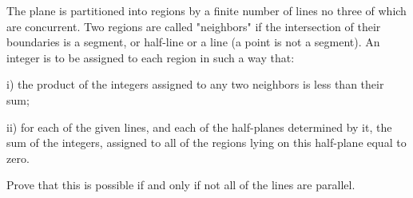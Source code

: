 The plane is partitioned into regions by a finite number of lines no three of which are concurrent. Two regions are called "neighbors" if the intersection of their boundaries is a segment, or half-line or a line (a point is not a segment). An integer is to be assigned to each region in such a way that:

i) the product of the integers assigned to any two neighbors is less than their sum;

ii) for each of the given lines, and each of the half-planes determined by it, the sum of the integers, assigned to all of the regions lying on this half-plane equal to zero.

Prove that this is possible if and only if not all of the lines are parallel.